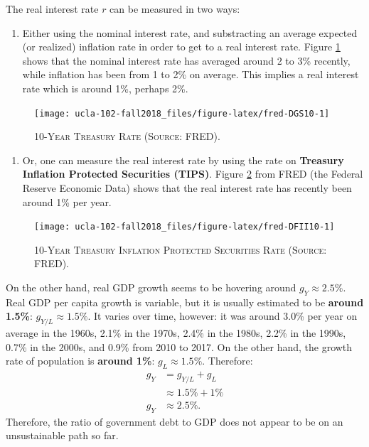 \documentclass[]{book}
\providecommand{\tightlist}{%
  \setlength{\itemsep}{0pt}\setlength{\parskip}{0pt}}
\theoremstyle{definition}
\theoremstyle{definition}
\theoremstyle{definition}
\theoremstyle{remark}
\begin{document}
The real interest rate \(r\) can be measured in two ways:

\begin{enumerate}
\def\labelenumi{\arabic{enumi}.}
\tightlist
\item
  Either using the nominal interest rate, and substracting an average
  expected (or realized) inflation rate in order to get to a real
  interest rate. Figure \ref{fig:fred-DGS10} shows that the nominal
  interest rate has averaged around 2 to 3\% recently, while inflation
  has been from 1 to 2\% on average. This implies a real interest rate
  which is around 1\%, perhaps 2\%.
\end{enumerate}



\begin{figure}

{\centering \texttt{[image: ucla-102-fall2018\_files/figure-latex/fred-DGS10-1]} 

}

\caption{\textsc{10-Year Treasury Rate (Source: FRED).}}\label{fig:fred-DGS10}
\end{figure}

\begin{enumerate}
\def\labelenumi{\arabic{enumi}.}
\setcounter{enumi}{1}
\tightlist
\item
  Or, one can measure the real interest rate by using the rate on
  \textbf{Treasury Inflation Protected Securities (TIPS)}. Figure
  \ref{fig:fred-DFII10} from FRED (the Federal Reserve Economic Data)
  shows that the real interest rate has recently been around 1\% per
  year.
\end{enumerate}




\begin{figure}

{\centering \texttt{[image: ucla-102-fall2018\_files/figure-latex/fred-DFII10-1]} 

}

\caption{\textsc{10-Year Treasury Inflation Protected
Securities Rate (Source: FRED).}}\label{fig:fred-DFII10}
\end{figure}

On the other hand, real GDP growth seems to be hovering around
\(g_Y \approx 2.5\%\). Real GDP per capita growth is variable, but it is
usually estimated to be \textbf{around 1.5\%}:
\(g_{Y/L} \approx 1.5\%\). It varies over time, however: it was around
3.0\% per year on average in the 1960s, 2.1\% in the 1970s, 2.4\% in the
1980s, 2.2\% in the 1990s, 0.7\% in the 2000s, and 0.9\% from 2010 to
2017. On the other hand, the growth rate of population is \textbf{around
1\%}: \(g_{L} \approx 1.5\%\). Therefore: \[
\begin{aligned}
g_Y &= g_{Y/L} + g_L\\
&\approx 1.5\% + 1\% \\
g_Y &\approx 2.5\%.
\end{aligned}
\] Therefore, the ratio of government debt to GDP does not appear to be
on an unsustainable path so far.
\end{document}
